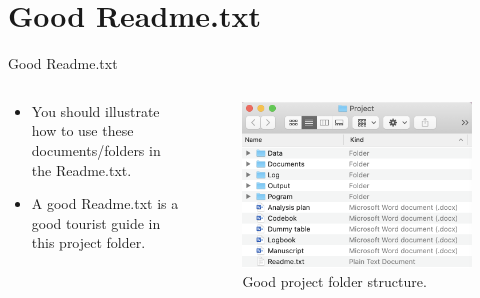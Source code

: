 \section{Good Readme.txt}	
\begin{frame}{Good Readme.txt}
\begin{columns}
	\begin{column}{0.5\textwidth} 
	\begin{itemize}
	\item You should illustrate how to use these documents/folders in the Readme.txt. 
	\item  A good Readme.txt is a good tourist guide in this project folder.

	\end{itemize}
	\end{column}
	
	\begin{column}{0.5\textwidth}
	\begin{figure}
			\includegraphics[scale=0.4]{image/structure}
			\caption{Good project folder structure.}
	\end{figure}
	\end{column}
	\end{columns}
\end{frame}

